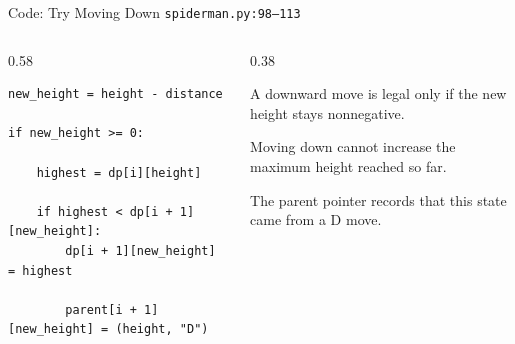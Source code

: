 \documentclass[aspectratio=169,11pt]{beamer}
\begin{document}
\begin{frame}[fragile]{Code: Try Moving Down}
\scriptsize
{} \texttt{spiderman.py:98--113}

\vspace{0.08cm}
\begin{columns}[T,totalwidth=\textwidth]
\begin{column}{0.58\textwidth}
\begin{lstlisting}[style=cpcode]
new_height = height - distance

if new_height >= 0:

    highest = dp[i][height]

    if highest < dp[i + 1][new_height]:
        dp[i + 1][new_height] = highest

        parent[i + 1][new_height] = (height, "D")
\end{lstlisting}
\end{column}
\begin{column}{0.38\textwidth}
\begin{tightitemize}
  \item A downward move is legal only if the new height stays nonnegative.
  \item Moving down cannot increase the maximum height reached so far.
  \item The parent pointer records that this state came from a D move.
\end{tightitemize}
\end{column}
\end{columns}
\end{frame}
\end{document}
